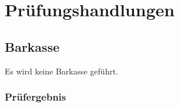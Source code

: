 \documentclass[%
	titlepage,oneside,12pt,headlines=1.5,numbers=noenddot, chapterprefix=false,parskip=full-,DIV=14,pagesize]{scrreprt}
\begin{document}
\chapter{Prüfungshandlungen}
\section{Barkasse}
Es wird keine Barkasse geführt.\newline

\subsection{Prüfergebnis}


\end{document}
